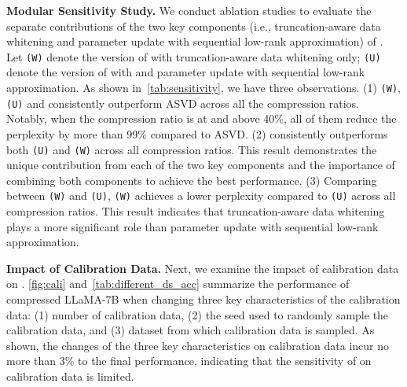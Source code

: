 % 

\textbf{Modular Sensitivity Study.}
We conduct ablation studies to evaluate the separate contributions of the two key components (i.e., truncation-aware data whitening and parameter update with sequential low-rank approximation) of \sysname. 
%
Let \sysname \texttt{(W)} denote the version of \sysname with truncation-aware data whitening only; \sysname \texttt{(U)} denote the version of \sysname with  and parameter update with sequential low-rank approximation.
As shown in~\cref{tab:sensitivity}, we have three observations. 
%
(1) \sysname\texttt{(W)}, \sysname\texttt{(U)} and \sysname  consistently outperform ASVD across all the compression ratios. Notably, when the compression ratio is at and above 40\%, all of them reduce the perplexity by more than 99\% compared to ASVD. 
%
(2) \sysname consistently outperforms both \sysname\texttt{(U)} and \sysname\texttt{(W)} across all compression ratios.
%
This result demonstrates the unique contribution from each of the two key components and the importance of combining both components to achieve the best performance.
%
(3) Comparing between \sysname\texttt{(W)} and \sysname\texttt{(U)}, \sysname\texttt{(W)} achieves a lower perplexity compared to \sysname\texttt{(U)} across all compression ratios. This result indicates that truncation-aware data whitening plays a more significant role than parameter update with sequential
low-rank approximation.

\textbf{Impact of Calibration Data.}
Next, we examine the impact of calibration data on \sysname. 
%
\cref{fig:cali} and~\cref{tab:different_ds_acc} summarize the performance of compressed LLaMA-7B when changing three key characteristics of the calibration data: (1) number of calibration data, (2) the seed used to randomly sample the calibration data, and (3)  dataset from which calibration data is sampled.
% 
As shown, the changes of the three key characteristics on calibration data incur no more than 3\% to the final performance, indicating that the sensitivity of \sysname on calibration data is limited.

